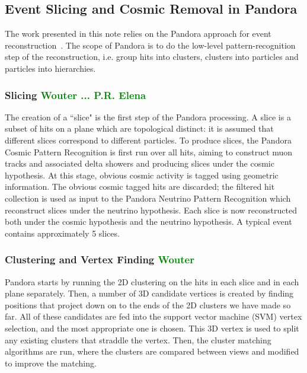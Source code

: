 \subsection{Event Slicing and Cosmic Removal in Pandora}

The work presented in this note relies on the Pandora approach for event reconstruction~\cite{bib:pandoraub}. The scope of Pandora is to do the low-level pattern-recognition step of the reconstruction, i.e. group hits into clusters, clusters into particles and particles into hierarchies. 

\subsubsection{Slicing \textcolor{green}{Wouter ... P.R. Elena}}
The creation of a ``slice" is the first step of the Pandora processing. A slice is a subset of hits  on a plane which are topological distinct:  it is assumed that different slices correspond to different particles. To produce slices, the Pandora Cosmic Pattern Recognition is first run over all hits, aiming to construct muon tracks and associated delta showers and producing slices under the cosmic hypothesis. At this stage, obvious cosmic activity is tagged using geometric information. The obvious cosmic tagged hits are discarded; the filtered hit collection is used as input to the Pandora Neutrino Pattern Recognition which reconstruct slices under the neutrino hypothesis. 
Each slice is now reconstructed both under the cosmic hypothesis and the neutrino hypothesis. A typical event contains approximately 5 slices.


\subsubsection{Clustering and Vertex Finding \textcolor{green}{Wouter}} 
Pandora starts by running the 2D clustering on the hits in each slice and in each plane separately. Then, a number of 3D candidate vertices is created by finding positions that project down on to the ends of the 2D clusters we have made so far. All of these candidates are fed into the support vector machine (SVM) vertex selection, and the most appropriate one is chosen. This 3D vertex is used to split any existing clusters that straddle the vertex. Then, the cluster matching algorithms are run, where the clusters are compared between views and modified to improve the matching.

